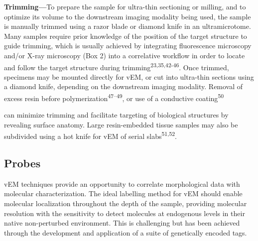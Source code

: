 \documentclass{article}
\begin{document}
\textbf{Trimming—}To prepare the sample for ultra-thin sectioning or milling, and to optimize its volume to the downstream imaging modality being used, the sample is manually trimmed using a razor blade or diamond knife in an ultramicrotome. Many samples require prior knowledge of the position of the target structure to guide trimming, which is usually achieved by integrating fluorescence microscopy and/or X-ray microscopy (Box 2) into a correlative workflow in order to locate and follow the target structure during trimming\textsuperscript{23,35,42-46}. Once trimmed, specimens may be mounted directly for vEM, or cut into ultra-thin sections using a diamond knife, depending on the downstream imaging modality. Removal of excess resin before polymerization\textsuperscript{47–49}, or use of a conductive coating\textsuperscript{50}

can minimize trimming and facilitate targeting of biological structures by revealing surface anatomy. Large resin-embedded tissue samples may also be subdivided using a hot knife for vEM of serial slabs\textsuperscript{51,52}.

\subsection*{Probes}

vEM techniques provide an opportunity to correlate morphological data with molecular characterization. The ideal labelling method for vEM should enable molecular localization throughout the depth of the sample, providing molecular resolution with the sensitivity to detect molecules at endogenous levels in their native non-perturbed environment. This is challenging but has been achieved through the development and application of a suite of genetically encoded tags.
\end{document}
